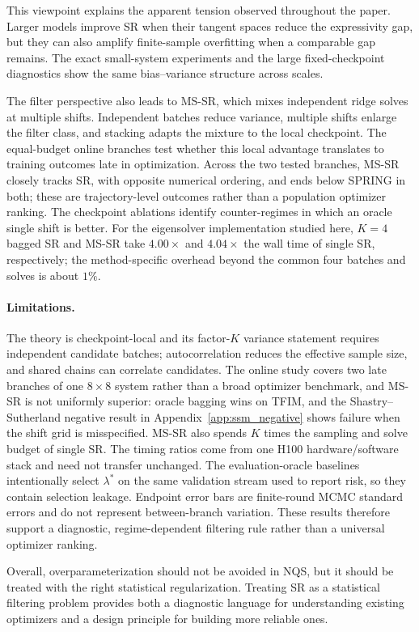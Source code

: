\documentclass{article}
\begin{document}
This viewpoint explains the apparent tension observed throughout the paper.
Larger models improve SR when their tangent spaces reduce the expressivity gap,
but they can also amplify finite-sample overfitting when a comparable gap
remains. The exact small-system experiments and the large
fixed-checkpoint diagnostics show the same bias--variance structure across
scales.

The filter perspective also leads to MS-SR, which mixes independent ridge
solves at multiple shifts. Independent batches reduce variance, multiple shifts
enlarge the filter class, and stacking adapts the mixture to the local
checkpoint. The equal-budget online branches test whether this local advantage
translates to training outcomes late in optimization. Across the two tested
branches, MS-SR closely tracks SR, with opposite numerical ordering, and ends
below SPRING in both; these are trajectory-level outcomes rather than a
population optimizer ranking. The checkpoint ablations identify counter-regimes
in which an oracle single shift is better.
For the eigensolver implementation studied here, $K=4$ bagged SR and MS-SR take
$4.00\times$ and $4.04\times$ the wall time of single SR, respectively; the
method-specific overhead beyond the common four batches and solves is about
$1\%$.

\paragraph{Limitations.}\label{sec:limitations}
The theory is checkpoint-local and its factor-$K$ variance statement requires
independent candidate batches; autocorrelation reduces the effective sample
size, and shared chains can correlate candidates. The online study covers two
late branches of one $8\times8$ system rather than a broad optimizer benchmark,
and MS-SR is not uniformly superior: oracle bagging wins on TFIM, and the
Shastry--Sutherland negative result in Appendix~\ref{app:ssm_negative} shows
failure when the shift grid is misspecified. MS-SR also spends $K$ times the
sampling and solve budget of single SR. The timing ratios come from one H100
hardware/software stack and need not transfer unchanged. The evaluation-oracle
baselines intentionally select $\lambda^*$ on the same validation stream used
to report risk, so they contain selection leakage. Endpoint error bars are
finite-round MCMC standard errors and do not represent between-branch
variation. These results therefore support a
diagnostic, regime-dependent filtering rule rather than a universal optimizer
ranking.

Overall, overparameterization should not be avoided in NQS, but
it should be treated with the right statistical regularization. Treating SR as a
statistical filtering problem provides both a diagnostic language for
understanding existing optimizers and a design principle for building more
reliable ones.

\clearpage
{}\label{main:references:start}



\clearpage
\appendix
{}\label{app:start}


\newpage

\end{document}
